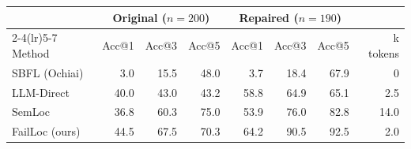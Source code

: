 \begin{tabular}{lrrrrrrr}
\toprule
 & \multicolumn{3}{c}{Original ($n=200$)} & \multicolumn{3}{c}{Repaired ($n=190$)} & \\
\cmidrule(lr){2-4}\cmidrule(lr){5-7}
Method & Acc@1 & Acc@3 & Acc@5 & Acc@1 & Acc@3 & Acc@5 & k tokens \\
\midrule
SBFL (Ochiai) & 3.0 & 15.5 & 48.0 & 3.7 & 18.4 & 67.9 & 0 \\
LLM-Direct & 40.0 & 43.0 & 43.2 & 58.8 & 64.9 & 65.1 & 2.5 \\
SemLoc & 36.8 & 60.3 & 75.0 & 53.9 & 76.0 & 82.8 & 14.0 \\
FailLoc (ours) & 44.5 & 67.5 & 70.3 & 64.2 & 90.5 & 92.5 & 2.0 \\
\bottomrule
\end{tabular}

